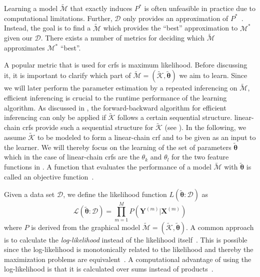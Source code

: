 \bigskip

Learning a model $\mathcal{\tilde{M}}$ that exactly induces $P^*$ is often unfeasible in practice due to computational limitations.
Further, $\mathcal{D}$ only provides an approximation of $P^*$~\citep{koller2009probabilistic}.
Instead, the goal is to find a $\mathcal{\tilde{M}}$ which provides the ``best'' approximation to $\mathcal{M}^*$ given our $\mathcal{D}$.
There exists a number of metrics for deciding which $\mathcal{\tilde{M}}$ approximates $\mathcal{M}^*$ ``best''.

A popular metric that is used for \glspl{crf} is \gls{maximum likelihood}.
Before discussing it, it is important to clarify which part of $\mathcal{\tilde{M}}=(\mathcal{\tilde{K}},\bm{\tilde{\theta}})$ we aim to learn.
Since we will later perform the parameter estimation by a repeated inferencing on $\mathcal{\tilde{M}}$, efficient inferencing is crucial to the runtime performance of the learning algorithm.
As discussed in , the \gls{forward-backward algorithm} for efficient inferencing can only be applied if $\mathcal{\tilde{K}}$ follows a certain sequential structure.
\Glspl{linear-chain crf} provide such a sequential structure for $\mathcal{\tilde{K}}$ (see ).
In the following, we assume $\mathcal{\tilde{K}}$ to be modeled to form a \gls{linear-chain crf} and to be given as an input to the learner.
We will thereby focus on the learning of the set of parameters $\bm{\tilde{\theta}}$ which in the case of \glspl{linear-chain crf} are the $\theta_k$ and $\theta_l$ for the two \glspl{feature function} in .
A function that evaluates the performance of a model $\mathcal{\tilde{M}}$ with $\bm{\tilde{\theta}}$ is called an \gls{objective function}~\citep{koller2009probabilistic}.

\bigskip
Given a data set $\mathcal{D}$, we define the likelihood function $L(\bm{\tilde{\theta}}:\mathcal{D})$ as
\begin{equation}
  \label{equ:likelihood}
  \mathcal{L}\left(\bm{\tilde{\theta}}:\mathcal{D}\right)=\prod_{m=1}^M P\left(\mathbf{Y}^{(m)}|\mathbf{X}^{(m)}\right)
\end{equation}
where $P$ is derived from the graphical model $\mathcal{\tilde{M}}=(\mathcal{\tilde{K}},\bm{\tilde{\theta}})$.
A common approach is to calculate the \textit{log-likelihood} instead of the likelihood itself~\citep{koller2009probabilistic,sutton2010introduction,mann2010generalized}.
This is possible since the log-likelihood is monotonically related to the likelihood and thereby the maximization problems are equivalent~\citep{koller2009probabilistic}.
A computational advantage of using the log-likelihood is that it is calculated over sums instead of products~\citep{koller2009probabilistic}.

